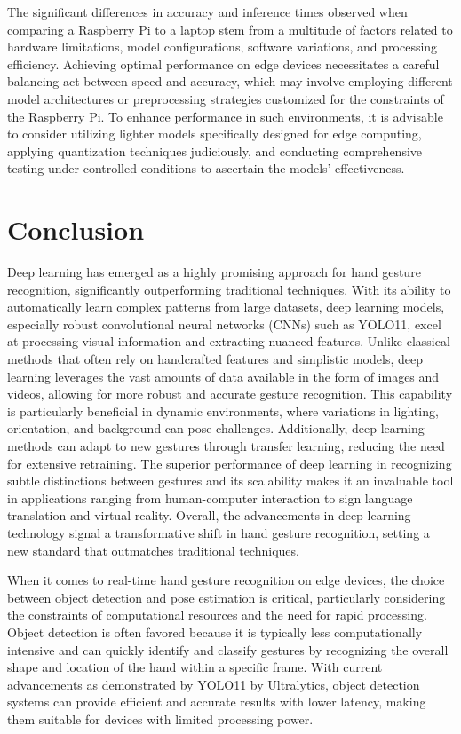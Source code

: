 \documentclass[12pt]{article}
\begin{document}
The significant differences in accuracy and inference times observed when comparing a Raspberry Pi to a laptop stem from a multitude of factors related to hardware limitations, model configurations, software variations, and processing efficiency. Achieving optimal performance on edge devices necessitates a careful balancing act between speed and accuracy, which may involve employing different model architectures or preprocessing strategies customized for the constraints of the Raspberry Pi. To enhance performance in such environments, it is advisable to consider utilizing lighter models specifically designed for edge computing, applying quantization techniques judiciously, and conducting comprehensive testing under controlled conditions to ascertain the models' effectiveness.

\section{Conclusion}

Deep learning has emerged as a highly promising approach for hand gesture recognition, significantly outperforming traditional techniques. With its ability to automatically learn complex patterns from large datasets, deep learning models, especially robust convolutional neural networks (CNNs) such as YOLO11, excel at processing visual information and extracting nuanced features. Unlike classical methods that often rely on handcrafted features and simplistic models, deep learning leverages the vast amounts of data available in the form of images and videos, allowing for more robust and accurate gesture recognition. This capability is particularly beneficial in dynamic environments, where variations in lighting, orientation, and background can pose challenges. Additionally, deep learning methods can adapt to new gestures through transfer learning, reducing the need for extensive retraining. The superior performance of deep learning in recognizing subtle distinctions between gestures and its scalability makes it an invaluable tool in applications ranging from human-computer interaction to sign language translation and virtual reality. Overall, the advancements in deep learning technology signal a transformative shift in hand gesture recognition, setting a new standard that outmatches traditional techniques.

When it comes to real-time hand gesture recognition on edge devices, the choice between object detection and pose estimation is critical, particularly considering the constraints of computational resources and the need for rapid processing. Object detection is often favored because it is typically less computationally intensive and can quickly identify and classify gestures by recognizing the overall shape and location of the hand within a specific frame. With current advancements as demonstrated by YOLO11 by Ultralytics, object detection systems can provide efficient and accurate results with lower latency, making them suitable for devices with limited processing power. 
\end{document}
